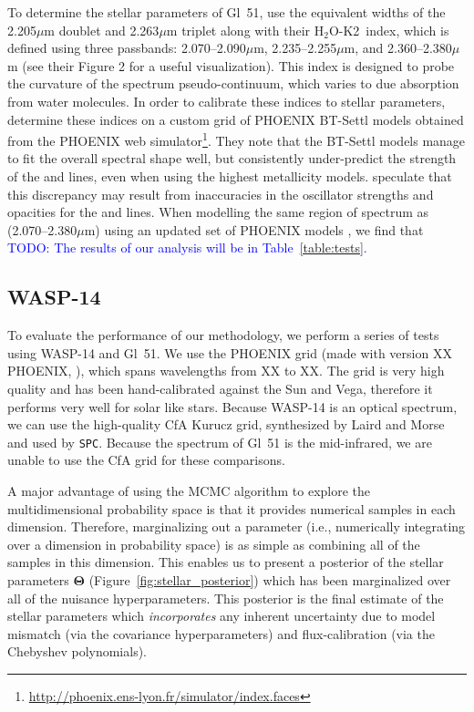 \documentclass[iop,floatfix]{emulateapj}
\newcommand{\HK}{$\textrm{H}_2$O-K2}
\newcommand{\vT}{ {\bm \Theta}}
\newcommand{\todo}[1]{ \textcolor{blue}{\\TODO: #1}}
\begin{document}
To determine the stellar parameters of Gl~51, \citep{rojas-ayala12} use the equivalent widths of the 2.205$\mu$m  doublet and 2.263$\mu$m  triplet along with their \HK\ index, which is defined using three passbands: 2.070--2.090$\mu$m, 2.235--2.255$\mu$m, and 2.360--2.380$\mu$m (see their Figure 2 for a useful visualization). This index is designed to probe the curvature of the spectrum pseudo-continuum, which varies to due absorption from water molecules. In order to calibrate these indices to stellar parameters, \citet{rojas-ayala12} determine these indices on a custom grid of PHOENIX BT-Settl models obtained from the PHOENIX web simulator\footnote{\url{http://phoenix.ens-lyon.fr/simulator/index.faces}}. They note that the BT-Settl models manage to fit the overall spectral shape well, but consistently under-predict the strength of the  and  lines, even when using the highest metallicity models. \citet{rajpurohit10} speculate that this discrepancy may result from inaccuracies in the oscillator strengths and opacities for the  and  lines. When modelling the same region of spectrum as \citet{rojas-ayala12} (2.070--2.380$\mu$m) using an updated set of PHOENIX models \citep{husser13}, we find that \todo{The results of our analysis will be in Table~\ref{table:tests}.} 

\subsection{WASP-14} \label{subsec:wasp}
To evaluate the performance of our methodology, we perform a series of tests using WASP-14 and Gl~51. We use the PHOENIX grid (made with version XX PHOENIX, \citealt{husser13}), which spans wavelengths from XX to XX. The grid is very high quality and has been hand-calibrated against the Sun and Vega, therefore it performs very well for solar like stars. Because WASP-14 is an optical spectrum, we can use the high-quality CfA Kurucz grid, synthesized by Laird and Morse and used by {\tt SPC}. Because the spectrum of Gl~51 is the mid-infrared, we are unable to use the CfA grid for these comparisons. 

A major advantage of using the MCMC algorithm to explore the multidimensional probability space is that it provides numerical samples in each dimension. Therefore, marginalizing out a parameter (i.e., numerically integrating over a dimension in probability space) is as simple as combining all of the samples in this dimension. This enables us to present a posterior of the stellar parameters $\vT$ (Figure~\ref{fig:stellar_posterior}) which has been marginalized over all of the nuisance hyperparameters. This posterior is the final estimate of the stellar parameters which \emph{incorporates} any inherent uncertainty due to model mismatch (via the covariance hyperparameters) and flux-calibration (via the Chebyshev polynomials).
\end{document}
